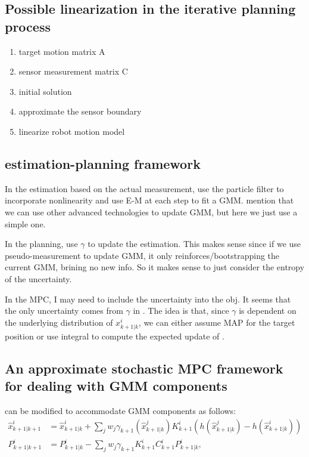 \documentclass[letterpaper, 10 pt, conference]{ieeeconf}  %
\begin{document}
\subsection{Possible linearization in the iterative planning process}
\begin{enumerate}
	\item target motion matrix A
	\item sensor measurement matrix C
	\item initial solution
	\item approximate the sensor boundary
	\item linearize robot motion model
\end{enumerate}

\subsection{estimation-planning framework}
In the estimation based on the actual measurement, use the particle filter to incorporate nonlinearity and use E-M at each step to fit a GMM. mention that we can use other advanced technologies to update GMM, but here we just use a simple one.

In the planning, use $\gamma$ to update the estimation. This makes sense since if we use pseudo-measurement to update GMM, it only reinforces/bootstrapping the current GMM, brining no new info. So it makes sense to just consider the entropy of the uncertainty.

In the MPC, I may need to include the uncertainty into the obj. It seems that the only uncertainty comes from $\gamma$ in .
The idea is that, since $\gamma$ is dependent on the underlying distribution of $x^i_{k+1|k}$, we can either assume MAP for the target position or use integral to compute the expected update of .

\subsection{An approximate stochastic MPC framework for dealing with GMM components}
 can be modified to accommodate GMM components as follows:
\begin{align}
\hat{x}^i_{k+1|k+1}&=\hat{x}^i_{k+1|k}+\sum\limits_j w_j\gamma_{k+1}(\hat{x}^j_{k+1|k})K^i_{k+1}(h(\hat{x}^j_{k+1|k})-h(\hat{x}^i_{k+1|k}))\label{subeqn:upd_mean_gmm}\\
P^i_{k+1|k+1}&=P^i_{k+1|k}-\sum\limits_j w_j\gamma_{k+1}K^i_{k+1}C^i_{k+1}P^i_{k+1|k}\label{subeqn:upd_cov_gmm},
\end{align}
\end{document}
